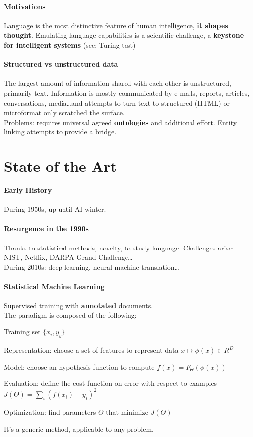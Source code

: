 \documentclass[10pt]{report}
\begin{document}
\paragraph{Motivations} Language is the most distinctive feature of human intelligence, \textbf{it shapes thought}. Emulating language capabilities is a scientific challenge, a \textbf{keystone for intelligent systems} (see: Turing test)
\paragraph{Structured vs unstructured data} The largest amount of information shared with each other is unstructured, primarily text. Information is mostly communicated by e-mails, reports, articles, conversations, media\ldots and attempts to turn text to structured (HTML) or microformat only scratched the surface.\\
Problems: requires universal agreed \textbf{ontologies} and additional effort. Entity linking attempts to provide a bridge.
\section{State of the Art}
\paragraph{Early History} During 1950s, up until AI winter.
\paragraph{Resurgence in the 1990s} Thanks to statistical methods, novelty, to study language. Challenges arise: NIST, Netflix, DARPA Grand Challenge\ldots\\
During 2010s: deep learning, neural machine translation\ldots
\paragraph{Statistical Machine Learning} Supervised training with \textbf{annotated} documents.\\
The paradigm is composed of the following:
\begin{list}{}{}
	\item Training set $\{x_i,y_y\}$
	\item Representation: choose a set of features to represent data $x\mapsto \phi(x) \in R^D$
	\item Model: choose an hypothesis function to compute $f(x) = F_\Theta(\phi(x))$
	\item Evaluation: define the cost function on error with respect to examples $J(\Theta) = \sum_i (f(x_i) - y_i)^2$
	\item Optimization: find parameters $\Theta$ that minimize $J(\Theta)$
\end{list}
It's a generic method, applicable to any problem.
\end{document}
